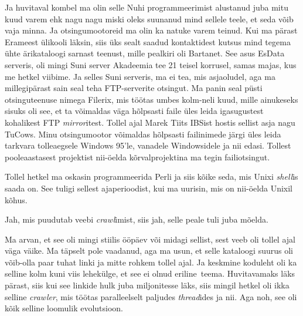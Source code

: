 Ja huvitaval kombel ma olin selle Nuhi programmeerimist alustanud juba mitu kuud 
varem ehk nagu nagu miski oleks suunanud mind sellele teele, et seda võib vaja 
minna. Ja  otsingumootoreid ma olin ka natuke varem teinud. Kui ma pärast 
Erameest  ülikooli läksin, siis  üks sealt saadud kontaktidest kutsus mind 
tegema ühte ärikataloogi sarnast teenust,  mille pealkiri oli Bartanet. See 
asus EsData serveris, oli mingi Suni server Akadeemia tee 21  
teisel korrusel, samas majas, kus me hetkel viibime. Ja selles Suni serveris, 
ma ei tea, mis asjaoludel, aga ma millegipärast sain seal teha FTP-serverite 
otsingut. Ma panin seal püsti otsinguteenuse nimega Filerix, mis töötas umbes 
kolm-neli kuud, mille ainukeseks sisuks oli see, et ta võimaldas väga hõlpsasti 
faile üles leida igasugustest kohalikest FTP \emph{mirror}itest. Tollel ajal  
Marek Tiits IBSist 
hostis sellist asja nagu TuCows. Minu  otsingumootor 
võimaldas hõlpsasti failinimede järgi üles leida tarkvara tolleaegsele Windows 
95'le, vanadele Windowsidele ja nii edasi. Tollest pooleaastasest projektist nii-öelda kõrvalprojektina ma tegin failiotsingut.


Tollel hetkel ma oskasin programmeerida Perli ja siis kõike 
seda, mis  Unixi \emph{shell}is saada on. See tuligi  sellest ajaperioodist, 
kui ma uurisin, mis on nii-öelda Unixil  kõhus.


Jah, mis puudutab veebi \emph{crawl}imist,  siis jah, selle peale tuli juba 
mõelda.


Ma arvan, et see oli mingi stiilis ööpäev või midagi sellist, sest veeb oli 
tollel ajal väga väike. Ma täpselt pole vaadanud, aga ma usun, et selle 
kataloogi suurus oli võib-olla paar tuhat linki ja mitte rohkem tollel ajal. Ja 
keskmine koduleht oli ka selline kolm kuni viis lehekülge, et see ei  olnud 
eriline teema. Huvitavamaks läks pärast, siis kui see linkide hulk juba 
miljonitesse läks, siis mingil hetkel oli ikka selline \emph{crawler}, mis 
töötas paralleelselt  paljudes \emph{thread}ides ja nii. Aga noh, see oli kõik 
selline loomulik evolutsioon. 

